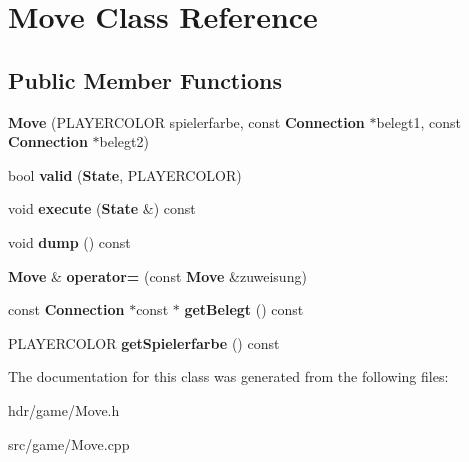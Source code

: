 \section{Move Class Reference}
\label{class_move}
\subsection*{Public Member Functions}
\begin{DoxyCompactItemize}
\item 
{\bfseries Move} (P\-L\-A\-Y\-E\-R\-C\-O\-L\-O\-R spielerfarbe, const {\bf Connection} $\ast$belegt1, const {\bf Connection} $\ast$belegt2)\label{class_move_a6040abbc43f535592305cb0c09b9be0a}

\item 
bool {\bfseries valid} ({\bf State}, P\-L\-A\-Y\-E\-R\-C\-O\-L\-O\-R)\label{class_move_a2651074156a1ab353be5f9b8c64649ee}

\item 
void {\bfseries execute} ({\bf State} \&) const \label{class_move_ae647057baca3c5d56261887a4eb2206f}

\item 
void {\bfseries dump} () const \label{class_move_a5fd65957977d9e30fd8898fa4a14ac56}

\item 
{\bf Move} \& {\bfseries operator=} (const {\bf Move} \&zuweisung)\label{class_move_a2cae41881447ddc9496cff2800ce01e2}

\item 
const {\bf Connection} $\ast$const $\ast$ {\bfseries get\-Belegt} () const \label{class_move_a6de84bf9dd651f869956186deb098ccb}

\item 
P\-L\-A\-Y\-E\-R\-C\-O\-L\-O\-R {\bfseries get\-Spielerfarbe} () const \label{class_move_a55523136edbb791118cd74be733a3670}

\end{DoxyCompactItemize}


The documentation for this class was generated from the following files\-:\begin{DoxyCompactItemize}
\item 
hdr/game/Move.\-h\item 
src/game/Move.\-cpp\end{DoxyCompactItemize}
